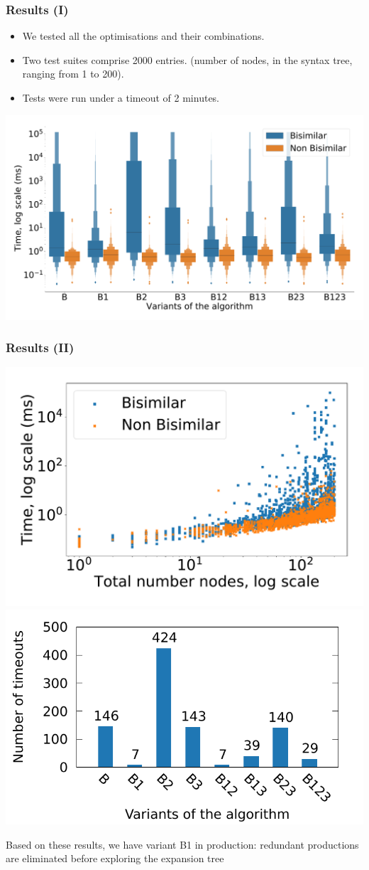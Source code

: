 \documentclass[10pt]{beamer}
\begin{document}
\begin{frame}
  \frametitle{Results (I)}
  \begin{itemize}
  \item We tested all the optimisations and their combinations.
  \item Two test suites comprise 2000 entries. (number of
    nodes, in the syntax tree, ranging from 1 to 200).
  \item Tests were run under a timeout of 2 minutes.
  \end{itemize}
  \pause
  \includegraphics[scale=0.20]{img/distribution_boxplot.pdf}
\end{frame}

\begin{frame}
  \frametitle{Results (II)}
  \includegraphics[width=.55\textwidth]{img/nodes_time.pdf}%
  \includegraphics[width=.55\textwidth]{img/timeouts.pdf}

  Based on these results, we have variant B1 in production: redundant
  productions are eliminated before exploring the expansion tree
\end{frame}
\end{document}

